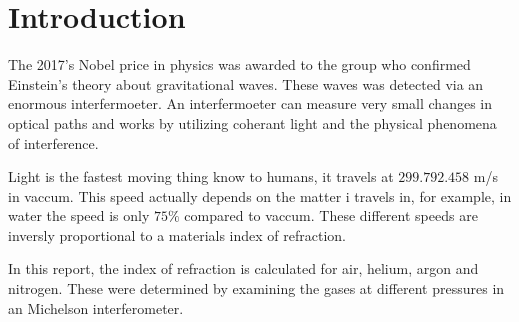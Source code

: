 \section{Introduction}

The 2017's Nobel price in physics was awarded to the group who confirmed Einstein's theory about gravitational waves. These waves was detected via an enormous interfermoeter. An interfermoeter can measure very small changes in optical paths and works by utilizing coherant light and the physical phenomena of interference. 

Light is the fastest moving thing know to humans, it travels at $299.792.458$ m/s in vaccum. This speed actually depends on the matter i travels in, for example, in water the speed is only $75\%$ compared to vaccum. These different speeds are inversly proportional to a materials index of refraction. 

In this report, the index of refraction is calculated for air, helium, argon and nitrogen. These were determined by examining the gases at different pressures in an Michelson interferometer.
